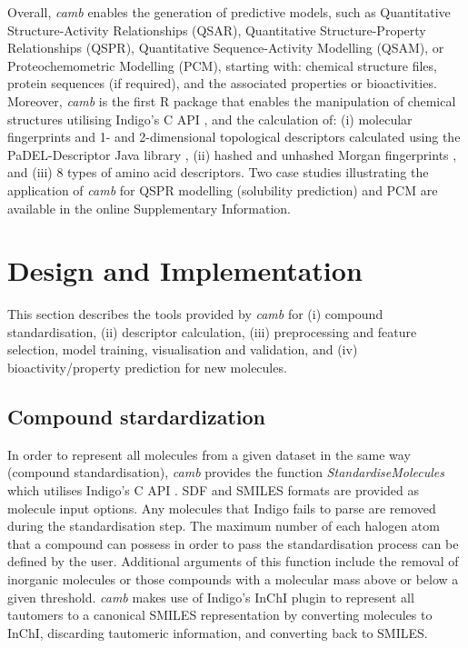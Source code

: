 \documentclass[twoside,a4wide,10pt]{article}
\begin{document}
Overall, {\it camb} enables the generation of predictive  models,
such as 
Quantitative Structure-Activity Relationships (QSAR), 
Quantitative Structure-Property Relationships (QSPR), 
Quantitative Sequence-Activity Modelling (QSAM), 
or Proteochemometric Modelling (PCM),
starting with: chemical structure files, protein sequences (if required), and the associated properties or bioactivities.
Moreover, {\it camb} is the first R package that enables the manipulation of chemical structures utilising Indigo's C API \citep{Indigo},
and the calculation of:
(i) molecular fingerprints and 1- and 2-dimensional topological 
descriptors calculated using the PaDEL-Descriptor Java library \citep{padel},
(ii) hashed and unhashed Morgan fingerprints \citep{extended_fp},
and (iii) 8 types of amino acid descriptors. 
Two case studies illustrating the application of {\it camb} for
QSPR modelling (solubility prediction) and PCM are available in the online Supplementary Information.




\section*{Design and Implementation}

This section describes the tools provided by {\it camb} 
for (i) compound standardisation, (ii) 
descriptor calculation, 
(iii) preprocessing and feature selection, model training, visualisation and validation, and (iv) bioactivity/property prediction for new molecules.

\subsection{Compound stardardization}
In order to represent all molecules from a given dataset in the same 
way (compound standardisation),
{\it camb}  provides the function {\it StandardiseMolecules} which utilises Indigo's C API \citep{Indigo}.
SDF and SMILES formats are provided as molecule input options. Any molecules that Indigo fails to parse are removed during the standardisation step.
The maximum number of each halogen atom that a compound can possess in order to pass the standardisation process can be defined by the user.
Additional arguments of this function include the removal of inorganic molecules
or those compounds with a molecular mass above or below a given threshold.
{\it camb} makes use of Indigo's InChI \citep{inchi} plugin to represent all tautomers to a canonical SMILES representation
by converting molecules to InChI, discarding tautomeric information, and converting back to SMILES.  
\end{document}
